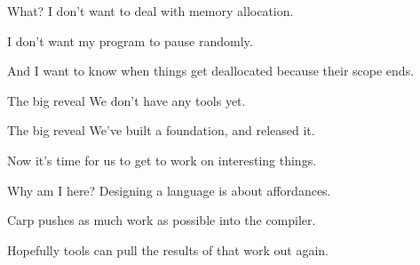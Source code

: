 \documentclass[14pt,aspectratio=169]{beamer}
\begin{document}
  \begin{frame}{What?}
    I don’t want to deal with memory allocation. \linebreak

    I don’t want my program to pause randomly.
    \linebreak

    And I want to know when things get deallocated because their scope ends.
  \end{frame}
  \begin{frame}{The big reveal}
    We don’t have any tools yet.
  \end{frame}
  \begin{frame}{The big reveal}
    We’ve built a foundation, and released it. \linebreak

    Now it’s time for us to get to work on interesting things.
  \end{frame}
  \begin{frame}{Why am I here?}
    Designing a language is about affordances. \linebreak

    Carp pushes as much work as possible into the compiler. \linebreak

    Hopefully tools can pull the results of that work out again.
  \end{frame}
\end{document}
